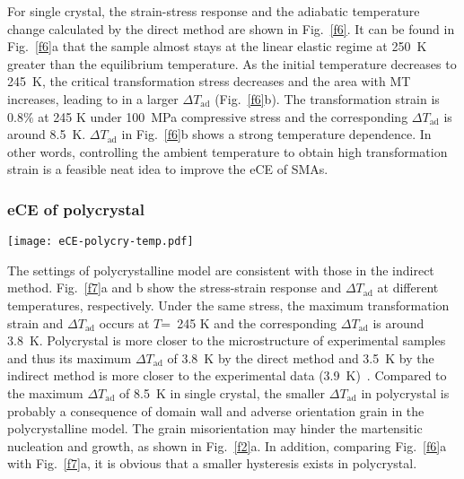\documentclass[reprint,3p,sort&compress,times,onecolumn]{elsarticle}
\begin{document}
For single crystal, the strain-stress response and the adiabatic temperature change calculated by the direct method are shown in Fig.~\ref{f6}. It can be found in Fig.~\ref{f6}a that the sample almost stays at the linear elastic regime at 250~K greater than the equilibrium temperature. As the initial temperature decreases to 245~K, the critical transformation stress decreases and the area with MT increases, leading to in a larger $\Delta T_{\text{ad}}$ (Fig.~\ref{f6}b). The transformation strain is 0.8$\%$ at 245 K under 100~MPa compressive stress and the corresponding $\Delta T_{\text{ad}}$ is around 8.5~K. $\Delta T_{\text{ad}}$ in Fig.~\ref{f6}b shows a strong temperature dependence. In other words, controlling the ambient temperature to obtain high transformation strain is a feasible neat idea to improve the eCE of SMAs.


\subsubsection{eCE of polycrystal}
\begin{figure*}[!t]
\centering
  \texttt{[image: eCE-polycry-temp.pdf]}
  \caption{(a) Stress-strain curves and (b) $\Delta T_{\text{ad}}$ of polycrystal under 100~MPa compressive stress at different temperatures.}\label{f7}
\end{figure*}

The settings of polycrystalline model are consistent with those in the indirect method. Fig.~\ref{f7}a and b show the stress-strain response and $\Delta T_{\text{ad}}$ at different temperatures, respectively. Under the same stress, the maximum transformation strain and $\Delta T_{\text{ad}}$ occurs at $T$=~245 K and the corresponding $\Delta T_{\text{ad}}$ is around 3.8~K. Polycrystal is more closer to the microstructure of experimental samples and thus its maximum $\Delta T_{\text{ad}}$ of 3.8~K by the direct method and 3.5~K by the indirect method is more closer to the experimental data (3.9~K)~\cite{qian2016elastocaloric}.
Compared to the maximum $\Delta T_{\text{ad}}$ of 8.5~K in single crystal, the smaller $\Delta T_{\text{ad}}$ in polycrystal is probably a consequence of domain wall and adverse orientation grain in the polycrystalline model. The grain misorientation may hinder the martensitic nucleation and growth, as shown in Fig.~\ref{f2}a.
In addition, comparing Fig.~\ref{f6}a with Fig.~\ref{f7}a, it is obvious that a smaller hysteresis exists in polycrystal.
\end{document}
